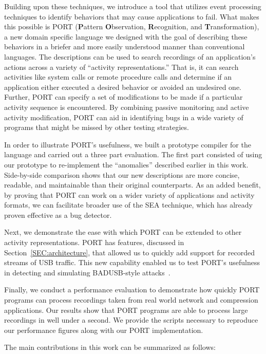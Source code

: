 Building upon these techniques,
we introduce a tool
that utilizes event processing techniques
to identify
behaviors 
that may cause applications to fail.
What makes this possible is PORT
(\textbf{P}attern \textbf{O}bservation, \textbf{R}ecognition, and
\textbf{T}ransformation),
a new domain specific language
we designed with the goal of
describing
these behaviors
in a briefer and more easily understood manner than conventional languages.
The descriptions can be used
to search recordings of an application's actions
across a variety of ``activity representations.'' That is, it can search activities like
system calls
or remote procedure calls and determine if  an application either executed a desired behavior
or avoided an undesired one.
Further, PORT can specify
a set of modifications
to be made
if a particular activity sequence is encountered.
By combining passive monitoring and active activity modification,
PORT can aid in identifying bugs
in a wide variety of programs
that might be missed by other testing strategies.

In order to illustrate PORT's usefulness,
we built a prototype compiler
for the language
and carried out a three part evaluation.
The first part consisted of using our prototype
to
re-implement the ``anomalies''
described earlier in this work.
Side-by-side comparison shows that our new
descriptions are more concise,
readable,
and maintainable
than their original counterparts.
As an added benefit, by proving that
PORT can work on a wider variety of applications and activity formats, we can facilitate broader use of the SEA technique,
which has already proven effective as a bug detector.

Next,
we demonstrate the ease with which PORT can be extended to
other activity representations. 
PORT has features, discussed in
Section~\ref{SEC:architecture},
that allowed us to quickly
add support for recorded streams of USB
traffic. This new capability enabled us to test PORT's usefulness in detecting and simulating BADUSB-style attacks~\cite{badusb}.

Finally,
we conduct a performance evaluation
to demonstrate how quickly  PORT programs can
process recordings taken from real world network and compression applications.
Our results show that PORT programs are able to process large recordings in well under a second. We provide the scripts necessary to reproduce our performance figures along with our PORT implementation.


The main contributions in this work can be summarized as follows:

